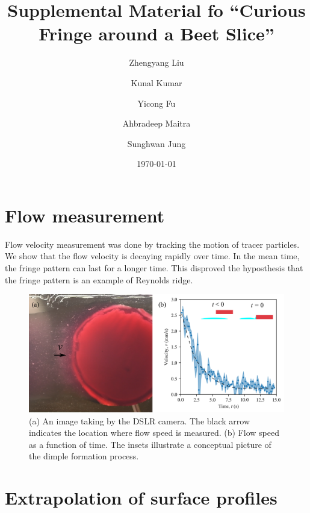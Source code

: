 \documentclass[aps,pre,onecolumn,superscriptaddress,notitlepage,10pt]{revtex4-2}
\begin{document}
\title{Supplemental Material fo ``Curious Fringe around a Beet Slice''}

\author{Zhengyang Liu}
\author{Kunal Kumar}
\author{Yicong Fu}
\author{Ahbradeep Maitra}
\author{Sunghwan Jung}
\date{\today}
\maketitle

\section{Flow measurement}

Flow velocity measurement was done by tracking the motion of tracer particles.
We show that the flow velocity is decaying rapidly over time. 
In the mean time, the fringe pattern can last for a longer time.
This disproved the hyposthesis that the fringe pattern is an example of Reynolds ridge.

\begin{figure}[ht]
    \centering
    \includegraphics[width=\linewidth]{Figures/beet_flow_measurement.png}
    \caption{
    (a) An image taking by the DSLR camera. The black arrow indicates the location where flow speed is measured.
    (b) Flow speed as a function of time. The insets illustrate a conceptual picture of the dimple formation process.
    }
    \label{fig:flow-measurement}
\end{figure}

\newpage

\section{Extrapolation of surface profiles}
\end{document}
